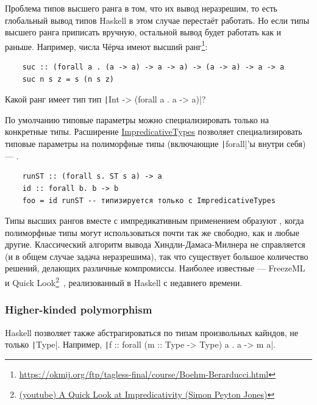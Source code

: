 Проблема типов высшего ранга в том, что их вывод неразрешим, то есть глобальный вывод типов Haskell в этом случае перестаёт работать.
Но если типы высшего ранга приписать вручную, остальной вывод будет работать как и раньше.
Например, числа Чёрча имеют высший ранг\footnote{\url{https://okmij.org/ftp/tagless-final/course/Boehm-Berarducci.html}}:
\begin{verbatim}
    suc :: (forall a . (a -> a) -> a -> a) -> (a -> a) -> a -> a
    suc n s z = s (n s z)
\end{verbatim}

\begin{task}
    Какой ранг имеет тип тип \texttt|Int -> (forall a . a -> a)|?
\end{task}

По умолчанию типовые параметры можно специализировать только на конкретные типы.
Расширение \href{https://downloads.haskell.org/ghc/latest/docs/users_guide/exts/impredicative_types.html}{ImpredicativeTypes} позволяет специализировать типовые параметры на полиморфные типы (включающие \texttt|forall|'ы внутри себя) --- .
\begin{verbatim}
    runST :: (forall s. ST s a) -> a
    id :: forall b. b -> b
    foo = id runST -- типизируется только с ImpredicativeTypes
\end{verbatim}

Типы высших рангов вместе с импредикативным применением образуют , когда полиморфные типы могут использоваться почти так же свободно, как и любые другие.
Классический алгоритм вывода Хиндли-Дамаса-Милнера не справляется (и в общем случае задача неразрешима), так что существует большое количество решений, делающих различные компромиссы.
Наиболее известные --- FreezeML~\cite{emrich2020freezeml} и Quick Look\footnote{\href{https://youtu.be/ZuNMo136QqI?si=qp8PAEeeF-bioCB_}{(youtube) A Quick Look at Impredicativity (Simon Peyton Jones)}}~\cite{serrano2020quick}, реализованный в Haskell с недавнего времени.

\subsubsection{Higher-kinded polymorphism}

Haskell позволяет также абстрагироваться по типам произвольных кайндов, не только \texttt|Type|.
Например, \texttt|f :: forall (m :: Type -> Type) a . a -> m a|.

